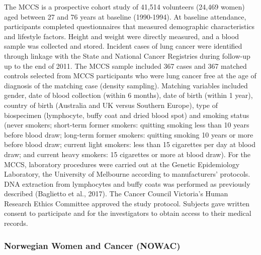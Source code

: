 \documentclass[11pt,twoside]{bristolthesis}
\begin{document}
The MCCS is a prospective cohort study of 41,514 volunteers (24,469 women) aged between 27 and 76 years at baseline (1990-1994). At baseline attendance, participants completed questionnaires that measured demographic characteristics and lifestyle factors. Height and weight were directly measured, and a blood sample was collected and stored. Incident cases of lung cancer were identified through linkage with the State and National Cancer Registries during follow-up up to the end of 2011. The MCCS sample included 367 cases and 367 matched controls selected from MCCS participants who were lung cancer free at the age of diagnosis of the matching case (density sampling). Matching variables included gender, date of blood collection (within 6 months), date of birth (within 1 year), country of birth (Australia and UK versus Southern Europe), type of biospecimen (lymphocyte, buffy coat and dried blood spot) and smoking status (never smokers; short-term former smokers: quitting smoking less than 10 years before blood draw; long-term former smokers: quitting smoking 10 years or more before blood draw; current light smokers: less than 15 cigarettes per day at blood draw; and current heavy smokers: 15 cigarettes or more at blood draw). For the MCCS, laboratory procedures were carried out at the Genetic Epidemiology Laboratory, the University of Melbourne according to manufacturers' protocols. DNA extraction from lymphocytes and buffy coats was performed as previously described (Baglietto et al., 2017). The Cancer Council Victoria's Human Research Ethics Committee approved the study protocol. Subjects gave written consent to participate and for the investigators to obtain access to their medical records.

\hypertarget{norwegian-women-and-cancer-nowac}{%
\subsubsection{Norwegian Women and Cancer (NOWAC)}\label{norwegian-women-and-cancer-nowac}}
\end{document}
